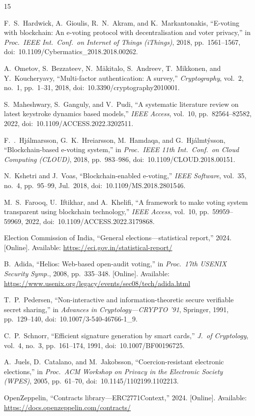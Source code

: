 \documentclass[conference]{IEEEtran}
\begin{document}
\begin{thebibliography}{15}

 F.~S.~Hardwick, A.~Gioulis, R.~N.~Akram, and K.~Markantonakis, ``E-voting with blockchain: An e-voting protocol with decentralisation and voter privacy,'' in \textit{Proc.\ IEEE Int.\ Conf.\ on Internet of Things (iThings)}, 2018, pp.~1561--1567, doi:~10.1109/Cybermatics\_2018.2018.00262.

 A.~Ometov, S.~Bezzateev, N.~M{\"a}kitalo, S.~Andreev, T.~Mikkonen, and Y.~Koucheryavy, ``Multi-factor authentication: A survey,'' \textit{Cryptography}, vol.~2, no.~1, pp.~1--31, 2018, doi:~10.3390/cryptography2010001.

 S.~Maheshwary, S.~Ganguly, and V.~Pudi, ``A systematic literature review on latest keystroke dynamics based models,'' \textit{IEEE Access}, vol.~10, pp.~82564--82582, 2022, doi:~10.1109/ACCESS.2022.3202511.

 F.~{\TH}.~Hj{\'a}lmarsson, G.~K.~Hrei{\dh}arsson, M.~Hamdaqa, and G.~Hj{\'a}lmt{\'y}sson, ``Blockchain-based e-voting system,'' in \textit{Proc.\ IEEE 11th Int.\ Conf.\ on Cloud Computing (CLOUD)}, 2018, pp.~983--986, doi:~10.1109/CLOUD.2018.00151.

 N.~Kshetri and J.~Voas, ``Blockchain-enabled e-voting,'' \textit{IEEE Software}, vol.~35, no.~4, pp.~95--99, Jul.~2018, doi:~10.1109/MS.2018.2801546.

 M.~S.~Farooq, U.~Iftikhar, and A.~Khelifi, ``A framework to make voting system transparent using blockchain technology,'' \textit{IEEE Access}, vol.~10, pp.~59959--59969, 2022, doi:~10.1109/ACCESS.2022.3179868.

 Election Commission of India, ``General elections---statistical report,'' 2024. [Online]. Available: \url{https://eci.gov.in/statistical-report/}

 B.~Adida, ``Helios: Web-based open-audit voting,'' in \textit{Proc.\ 17th USENIX Security Symp.}, 2008, pp.~335--348. [Online]. Available: \url{https://www.usenix.org/legacy/events/sec08/tech/adida.html}

 T.~P.~Pedersen, ``Non-interactive and information-theoretic secure verifiable secret sharing,'' in \textit{Advances in Cryptology---CRYPTO '91}, Springer, 1991, pp.~129--140, doi:~10.1007/3-540-46766-1\_9.

 C.~P.~Schnorr, ``Efficient signature generation by smart cards,'' \textit{J.\ of Cryptology}, vol.~4, no.~3, pp.~161--174, 1991, doi:~10.1007/BF00196725.

 A.~Juels, D.~Catalano, and M.~Jakobsson, ``Coercion-resistant electronic elections,'' in \textit{Proc.\ ACM Workshop on Privacy in the Electronic Society (WPES)}, 2005, pp.~61--70, doi:~10.1145/1102199.1102213.

 OpenZeppelin, ``Contracts library---ERC2771Context,'' 2024. [Online]. Available: \url{https://docs.openzeppelin.com/contracts/}

\end{thebibliography}
\end{document}
